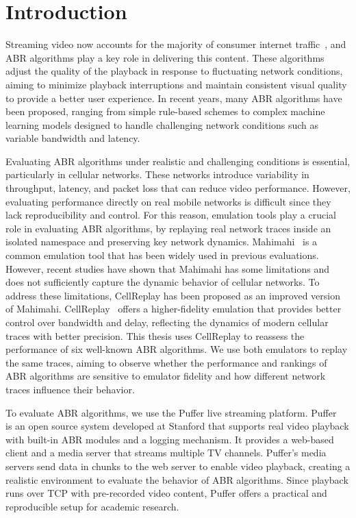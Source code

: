 \section{Introduction}\label{s:intro}

Streaming video now accounts for the majority of consumer internet traffic~\cite{demandsage2025}, and ABR algorithms play a key role in delivering this content. These algorithms adjust the quality of the playback in response to fluctuating network conditions, aiming to minimize playback interruptions and maintain consistent visual quality to provide a better user experience. In recent years, many ABR algorithms have been proposed, ranging from simple rule-based schemes to complex machine learning models designed to handle challenging network conditions such as variable bandwidth and latency.

Evaluating ABR algorithms under realistic and challenging conditions is essential, particularly in cellular networks. These networks introduce variability in throughput, latency, and packet loss that can reduce video performance. However, evaluating performance directly on real mobile networks is difficult since they lack reproducibility and control. For this reason, emulation tools play a crucial role in evaluating ABR algorithms, by replaying real network traces inside an isolated namespace and preserving key network dynamics. Mahimahi~\cite{mahimahi} is a common emulation tool that has been widely used in previous evaluations. However, recent studies have shown that Mahimahi has some limitations and does not sufficiently capture the dynamic behavior of cellular networks. To address these limitations, CellReplay has been proposed as an improved version of Mahimahi. CellReplay~\cite{cellreplay-nsdi25} offers a higher-fidelity emulation that provides better control over bandwidth and delay, reflecting the dynamics of modern cellular traces with better precision. This thesis uses CellReplay to reassess the performance of six well-known ABR algorithms. We use both emulators to replay the same traces, aiming to observe whether the performance and rankings of ABR algorithms are sensitive to emulator fidelity and how different network traces influence their behavior.

To evaluate ABR algorithms, we use the Puffer live streaming platform. Puffer~\cite{puffer} is an open source system developed at Stanford that supports real video playback with built-in ABR modules and a logging mechanism. It provides a web-based client and a media server that streams multiple TV channels. Puffer’s media servers send data in chunks to the web server to enable video playback, creating a realistic environment to evaluate the behavior of ABR algorithms. Since playback runs over TCP with pre-recorded video content, Puffer offers a practical and reproducible setup for academic research.


